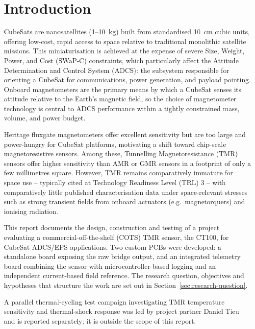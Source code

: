 \documentclass[12pt,a4paper]{article}
\begin{document}
\clearpage


\section{Introduction}
\label{sec:intro}

CubeSats are nanosatellites (1--10~kg) built from standardised 10~cm cubic units, offering low-cost, rapid access to space relative to traditional monolithic satellite missions. This miniaturisation is achieved at the expense of severe Size, Weight, Power, and Cost (SWaP-C) constraints, which particularly affect the Attitude Determination and Control System (ADCS): the subsystem responsible for orienting a CubeSat for communications, power generation, and payload pointing. Onboard magnetometers are the primary means by which a CubeSat senses its attitude relative to the Earth's magnetic field, so the choice of magnetometer technology is central to ADCS performance within a tightly constrained mass, volume, and power budget.

Heritage fluxgate magnetometers offer excellent sensitivity but are too large and power-hungry for CubeSat platforms, motivating a shift toward chip-scale magnetoresistive sensors. Among these, Tunnelling Magnetoresistance (TMR) sensors offer higher sensitivity than AMR or GMR sensors in a footprint of only a few millimetres square. However, TMR remains comparatively immature for space use -- typically cited at Technology Readiness Level (TRL) 3 -- with comparatively little published characterisation data under space-relevant stresses such as strong transient fields from onboard actuators (e.g.\ magnetorquers) and ionising radiation.

This report documents the design, construction and testing of a project evaluating a commercial-off-the-shelf (COTS) TMR sensor, the CT100, for CubeSat ADCS/EPS applications. Two custom PCBs were developed: a standalone board exposing the raw bridge output, and an integrated telemetry board combining the sensor with microcontroller-based logging and an independent current-based field reference. The research question, objectives and hypotheses that structure the work are set out in Section~\ref{sec:research-question}.

A parallel thermal-cycling test campaign investigating TMR temperature sensitivity and thermal-shock response was led by project partner Daniel Tieu and is reported separately; it is outside the scope of this report.
\end{document}
